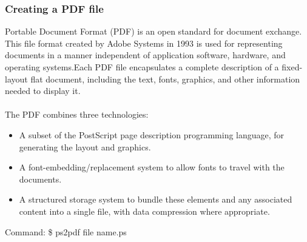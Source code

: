 \subsubsection{Creating a PDF file}
Portable Document Format (PDF) is an open standard for document exchange. This file format created by Adobe Systems in 1993 is used for representing documents in a manner independent of application software, hardware, and operating systems.Each PDF file encapsulates a complete description of a fixed-layout flat document, including the text, fonts, graphics, and other information needed to display it.\\\\
The PDF combines three technologies:\\
\begin{itemize}
\item A subset of the PostScript page description programming language, for generating the layout and graphics.
\item A font-embedding/replacement system to allow fonts to travel with the documents.
\item A structured storage system to bundle these elements and any associated content into a single file, with data compression where appropriate.
\end{itemize}
Command: \$ ps2pdf file name.ps\\

